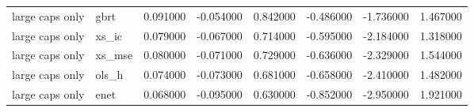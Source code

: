 \begin{table}
\begin{tabular}{llrrrrrr}
large caps only & gbrt & 0.091000 & -0.054000 & 0.842000 & -0.486000 & -1.736000 & 1.467000 \\
large caps only & xs\_ic & 0.079000 & -0.067000 & 0.714000 & -0.595000 & -2.184000 & 1.318000 \\
large caps only & xs\_mse & 0.080000 & -0.071000 & 0.729000 & -0.636000 & -2.329000 & 1.544000 \\
large caps only & ols\_h & 0.074000 & -0.073000 & 0.681000 & -0.658000 & -2.410000 & 1.482000 \\
large caps only & enet & 0.068000 & -0.095000 & 0.630000 & -0.852000 & -2.950000 & 1.921000 \\
\bottomrule
\end{tabular}
\end{table}
